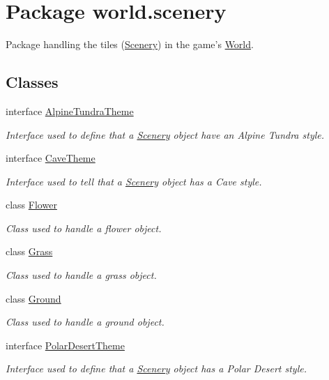 \hypertarget{a00091}{\section{Package world.\-scenery}
\label{a00091}
}


Package handling the tiles (\hyperlink{a00024}{Scenery}) in the game's \hyperlink{a00039}{World}.  


\subsection*{Classes}
\begin{DoxyCompactItemize}
\item 
interface \hyperlink{a00002}{Alpine\-Tundra\-Theme}
\begin{DoxyCompactList}\small\item\em Interface used to define that a \hyperlink{a00024}{Scenery} object have an Alpine Tundra style. \end{DoxyCompactList}\item 
interface \hyperlink{a00004}{Cave\-Theme}
\begin{DoxyCompactList}\small\item\em Interface used to tell that a \hyperlink{a00024}{Scenery} object has a Cave style. \end{DoxyCompactList}\item 
class \hyperlink{a00009}{Flower}
\begin{DoxyCompactList}\small\item\em Class used to handle a flower object. \end{DoxyCompactList}\item 
class \hyperlink{a00011}{Grass}
\begin{DoxyCompactList}\small\item\em Class used to handle a grass object. \end{DoxyCompactList}\item 
class \hyperlink{a00012}{Ground}
\begin{DoxyCompactList}\small\item\em Class used to handle a ground object. \end{DoxyCompactList}\item 
interface \hyperlink{a00019}{Polar\-Desert\-Theme}
\begin{DoxyCompactList}\small\item\em Interface used to define that a \hyperlink{a00024}{Scenery} object has a Polar Desert style. \end{DoxyCompactList}\item 

\end{DoxyCompactItemize}
